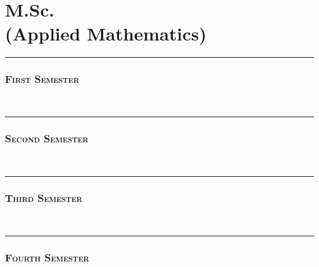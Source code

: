 \documentclass[8pt,b5paper]{extbook}
\newcommand{\cols}{1}
\begin{document}
\part{\normalsize M.Sc. \\(Applied Mathematics)}
\newpage
\rule{100mm}{3pt}
\section{\scshape First Semester}
\\
\rule{100mm}{3pt}
\section{\scshape  Second Semester}
\\
\rule{100mm}{3pt}
\section{\scshape  Third Semester}
\\
\rule{100mm}{3pt}
\section{\scshape  Fourth Semester}
\vspace{-0.2cm}
\newpage
%
{}
\end{document}
